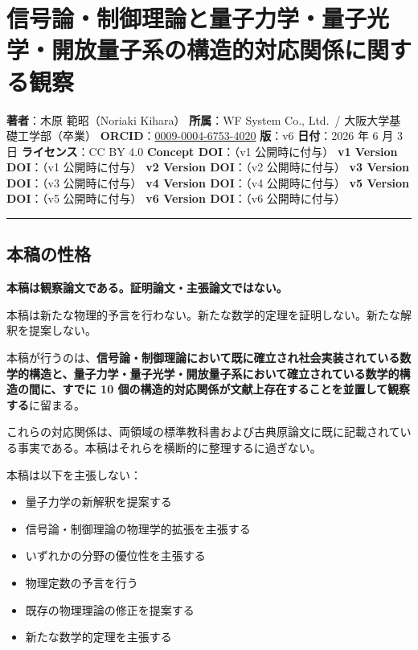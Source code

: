 \documentclass[
]{ltjsarticle}
\author{}
\date{}
\providecommand{\tightlist}{%
  \setlength{\itemsep}{0pt}\setlength{\parskip}{0pt}}
\begin{document}
\section{信号論・制御理論と量子力学・量子光学・開放量子系の構造的対応関係に関する観察}\label{ux4fe1ux53f7ux8ad6ux5236ux5fa1ux7406ux8ad6ux3068ux91cfux5b50ux529bux5b66ux91cfux5b50ux5149ux5b66ux958bux653eux91cfux5b50ux7cfbux306eux69cbux9020ux7684ux5bfeux5fdcux95a2ux4fc2ux306bux95a2ux3059ux308bux89b3ux5bdf}

\textbf{著者}：木原 範昭（Noriaki Kihara） \textbf{所属}：WF System Co.,
Ltd.~/ 大阪大学基礎工学部（卒業）
\textbf{ORCID}：\href{https://orcid.org/0009-0004-6753-4020}{0009-0004-6753-4020}
\textbf{版}：v6 \textbf{日付}：2026 年 6 月 3 日 \textbf{ライセンス}：CC
BY 4.0 \textbf{Concept DOI}：（v1 公開時に付与） \textbf{v1 Version
DOI}：（v1 公開時に付与） \textbf{v2 Version DOI}：（v2 公開時に付与）
\textbf{v3 Version DOI}：（v3 公開時に付与） \textbf{v4 Version
DOI}：（v4 公開時に付与） \textbf{v5 Version DOI}：（v5 公開時に付与）
\textbf{v6 Version DOI}：（v6 公開時に付与）

\begin{center}\rule{0.5\linewidth}{0.5pt}\end{center}

\subsection{本稿の性格}\label{ux672cux7a3fux306eux6027ux683c}

\textbf{本稿は観察論文である。証明論文・主張論文ではない。}

本稿は新たな物理的予言を行わない。新たな数学的定理を証明しない。新たな解釈を提案しない。

本稿が行うのは、\textbf{信号論・制御理論において既に確立され社会実装されている数学的構造と、量子力学・量子光学・開放量子系において確立されている数学的構造の間に、すでに
10 個の構造的対応関係が文献上存在することを並置して観察する}に留まる。

これらの対応関係は、両領域の標準教科書および古典原論文に既に記載されている事実である。本稿はそれらを横断的に整理するに過ぎない。

本稿は以下を主張しない：

\begin{itemize}
\tightlist
\item
  量子力学の新解釈を提案する
\item
  信号論・制御理論の物理学的拡張を主張する
\item
  いずれかの分野の優位性を主張する
\item
  物理定数の予言を行う
\item
  既存の物理理論の修正を提案する
\item
  新たな数学的定理を主張する
\end{itemize}
\end{document}
